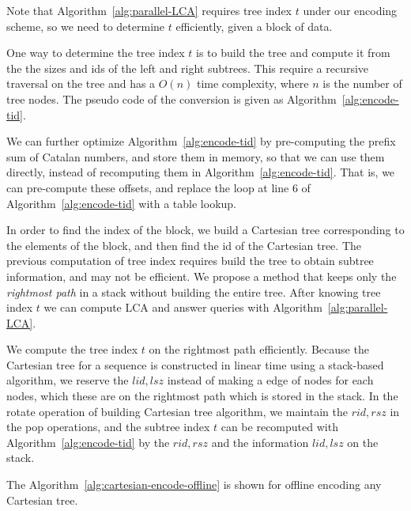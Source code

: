 Note that Algorithm~\ref{alg:parallel-LCA} requires tree index $t$
under our encoding scheme, so we need to determine $t$ efficiently,
given a block of data.


One way to determine the tree index $t$ is to build the tree and
compute it from the the sizes and ids of the left and right subtrees.
This require a recursive traversal on the tree and has a $O(n)$ time
complexity, where $n$ is the number of tree nodes.  The pseudo code of
the conversion is given as Algorithm~\ref{alg:encode-tid}.



We can further optimize Algorithm~\ref{alg:encode-tid} by
pre-computing the prefix sum of Catalan numbers, and store them in
memory, so that we can use them directly, instead of recomputing them
in Algorithm~\ref{alg:encode-tid}.  That is, we can pre-compute these
offsets, and replace the loop at line 6 of
Algorithm~\ref{alg:encode-tid} with a table lookup.


In order to find the index of the block, we build a Cartesian tree
corresponding to the elements of the block, and then find the id of the
Cartesian tree. The previous computation of tree index requires build
the tree to obtain subtree information, and may not be efficient.  We
propose a method that keeps only the {\em rightmost path} in a stack
without building the entire tree.  After knowing tree index $t$ we can
compute LCA and answer queries with Algorithm~\ref{alg:parallel-LCA}.

We compute the tree index $t$ on the rightmost path efficiently. Because
the Cartesian tree for a sequence is constructed in linear time using a
stack-based algorithm, we reserve the $\mathit{lid}, \mathit{lsz}$
instead of making a edge of nodes for each nodes, which these are on the
rightmost path which is stored in the stack.  In the rotate operation of
building Cartesian tree algorithm, we maintain the $\mathit{rid},
\mathit{rsz}$ in the pop operations, and the subtree index $t$ can be
recomputed with Algorithm~\ref{alg:encode-tid} by the $\mathit{rid},
\mathit{rsz}$ and the information $\mathit{lid}, \mathit{lsz}$ on the
stack.

The Algorithm~\ref{alg:cartesian-encode-offline} is shown for offline
encoding any Cartesian tree.



